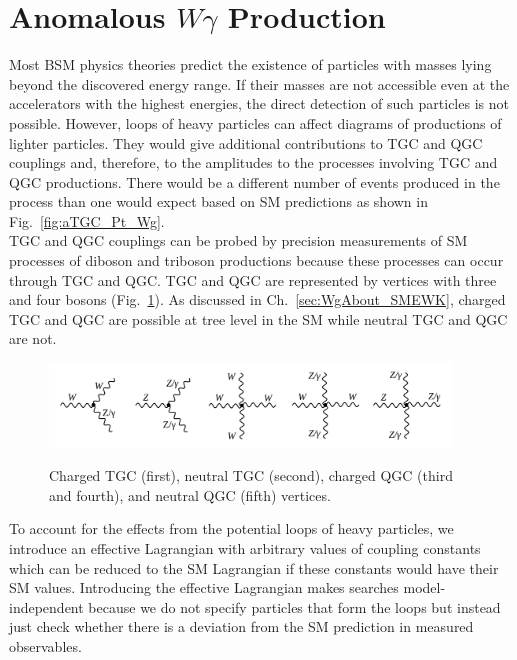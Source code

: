 \section{Anomalous $W\gamma$ Production}
\label{sec:WgAbout_ATGC}
Most BSM physics theories predict the existence of particles with masses lying beyond the discovered energy range. If their masses are not accessible even at the accelerators with the highest energies, the direct detection of such particles is not possible. However, loops of heavy particles can affect diagrams of productions of lighter particles. They would give additional contributions to TGC and QGC couplings and, therefore, to the amplitudes to the processes involving TGC and QGC productions. There would be a different number of events produced in the process than one would expect based on SM predictions as shown in Fig.~\ref{fig:aTGC_Pt_Wg}.\\
TGC and QGC couplings can be probed by precision measurements of SM processes of diboson and triboson productions because these processes can occur through TGC and QGC. TGC and QGC are represented by vertices with three and four bosons (Fig.~\ref{fig:TGC_and_QGC_vertices}). As discussed in Ch.~\ref{sec:WgAbout_SMEWK}, charged TGC and QGC are possible at tree level in the SM while neutral TGC and QGC are not.\\ 
\begin{figure}[htb]
  \begin{center}
    {\includegraphics[width=0.95\textwidth]{../figs/WgAbout/TGC_and_QGC_vertices.png}}
    \caption{Charged TGC (first), neutral TGC (second), charged QGC (third and fourth), and neutral QGC (fifth) vertices.}
    \label{fig:TGC_and_QGC_vertices}
  \end{center}
\end{figure}
To account for the effects from the potential loops of heavy particles, we introduce an effective Lagrangian with arbitrary values of coupling constants which can be reduced to the SM Lagrangian if these constants would have their SM values. Introducing the effective Lagrangian makes searches model-independent because we do not specify particles that form the loops but instead just check whether there is a deviation from the SM prediction in measured observables. \\
